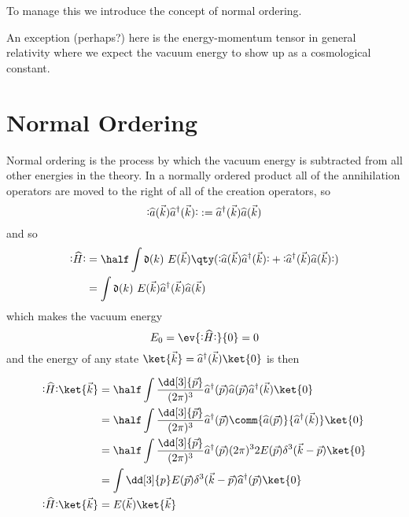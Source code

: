 To manage this we introduce the concept of normal ordering.

\begin{illustration}
  An exception (perhaps?) here is the energy-momentum tensor in
  general relativity where we expect the vacuum energy to show up as a
  cosmological constant.
\end{illustration}


\section{Normal Ordering}
\label{sec:normal-ordering}

Normal ordering is the process by which the vacuum energy is
subtracted from all other energies in the theory. In a normally
ordered product all of the annihilation operators are moved to the
right of all of the creation operators, so
\begin{equation}
  \label{eq:30}
  \normbracket{ \Op{a}(\vec{k}) \hOp{a}(\vec{k})} := \hOp{a}(\vec{k}) \Op{a}(\vec{k})
\end{equation}
and so
\begin{align*}
  \nOp{H} &= \half \int \nm{k} E(\vec{k}) \qty( \normbracket{ \Op{a}(\vec{k}) \hOp{a}(\vec{k})} + \normbracket{ \hOp{a}(\vec{k}) \Op{a}(\vec{k})}) \\
&= \int \nm{k} E(\vec{k}) \hOp{a}(\vec{k}) \Op{a}(\vec{k})
\end{align*}
which makes the vacuum energy
\[ E_0 = \ev{\nOp{H}}{0} = 0 \]
and the energy of any state $\ket{\vec{k}} = \hOp{a}(\vec{k}) \ket{0}$ is then

\begin{derivation}
  \begin{align}
    \nOp{H} \ket{\vec{k}} &= \half \int \frac{\dd[3]{\vec{p}}}{(2\pi)^3}  \hOp{a}(\vec{p}) \Op{a}(\vec{p}) \hOp{a}(\vec{k}) \ket{0} \nonumber\\
&= \half \int \frac{\dd[3]{\vec{p}}}{(2\pi)^3}  \hOp{a}(\vec{p}) \comm{\Op{a}(\vec{p})}{\hOp{a}(\vec{k})} \ket{0} \nonumber\\
&= \half \int \frac{\dd[3]{\vec{p}}}{(2\pi)^3}  \hOp{a}(\vec{p}) (2 \pi)^3 2 E(\vec{p}) \delta^3(\vec{k} - \vec{p}) \ket{0} \nonumber\\
&= \int \dd[3]{p} E(\vec{p}) \delta^3(\vec{k} - \vec{p}) \hOp{a}(\vec{p}) \ket{0} \nonumber\\
\nOp{H} \ket{\vec{k}} &= E(\vec{k}) \ket{\vec{k}}
  \end{align}
\end{derivation}

